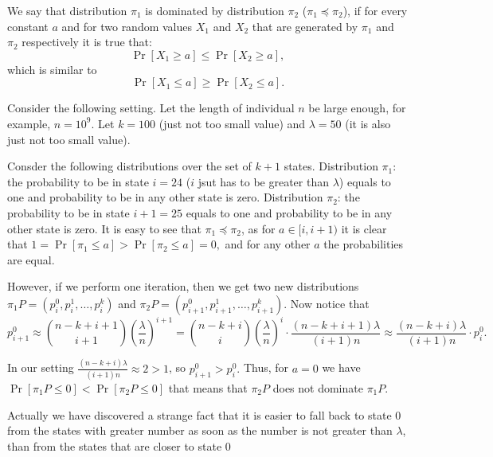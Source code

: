 \documentclass{article}
\begin{document}
We say that distribution $\pi_1$ is dominated by distribution $\pi_2$ ($\pi_1 \preceq \pi_2$), if for every constant $a$ and for two random values $X_1$ and $X_2$ that are generated by $\pi_1$ and $\pi_2$ respectively it is true that:
$$\Pr[X_1 \ge a] \le \Pr[X_2 \ge a],$$
which is similar to
$$\Pr[X_1 \le a] \ge \Pr[X_2 \le a].$$

Consider the following setting. Let the length of individual $n$ be large enough, for example, $n = 10^9.$ Let $k = 100$ (just not too small value) and $\lambda = 50$ (it is also just not too small value).

Consder the following distributions over the set of $k + 1$ states. Distribution $\pi_1$: the probability to be in state $i = 24$ ($i$ jsut has to be greater than $\lambda$) equals to one and probability to be in any other state is zero. Distribution $\pi_2$: the probability to be in state $i + 1= 25$ equals to one and probability to be in any other state is zero. It is easy to see that $\pi_1 \preceq \pi_2$, as for $a \in [i, i + 1)$ it is clear that $1 = \Pr[\pi_1 \le a] > \Pr[\pi_2 \le a] = 0,$ and for any other $a$ the probabilities are equal.

However, if we perform one iteration, then we get two new distributions $\pi_1 P = (p_i^0, p_i^1, \dots, p_i^k)$ and $\pi_2 P = (p_{i + 1}^0, p_{i + 1}^1, \dots, p_{i + 1}^k)$.
Now notice that
$$p_{i + 1}^0 \approx \binom{n - k + i + 1}{i + 1}\left(\frac{\lambda}{n}\right)^{i + 1} = \binom{n - k + i}{i} \left(\frac{\lambda}{n}\right)^i \cdot \frac{(n - k + i + 1)\lambda}{(i + 1)n} \approx \frac{(n - k + i)\lambda}{(i + 1)n} \cdot p_i^0.$$

In our setting $\frac{(n - k + i)\lambda}{(i + 1)n} \approx 2 > 1$, so $p_{i + 1}^0 > p_i^0.$ Thus, for $a = 0$ we have $\Pr[\pi_1 P \le 0] < \Pr[\pi_2 P \le 0]$ that means that $\pi_2 P$ does not dominate $\pi_1 P.$

Actually we have discovered a strange fact that it is easier to fall back to state $0$ from the states with greater number as soon as the number is not greater than $\lambda$, than from the states that are closer to state $0$
\end{document}
